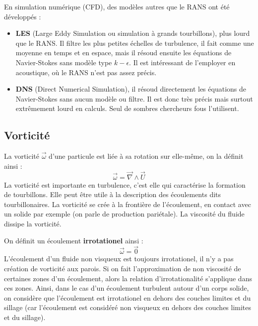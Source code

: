 En simulation numérique (CFD), des modèles autres que le RANS ont été développés :
%
\begin{itemize}
    \item \textbf{LES} (Large Eddy Simulation ou simulation à grands tourbillons), plus lourd que le RANS. Il filtre les plus petites échelles de turbulence, il fait comme une moyenne en temps et en espace, mais il résoud ensuite les équations de Navier-Stokes sans modèle type $k-\epsilon$. Il est intéressant de l'employer en acoustique, où le RANS n'est pas assez précis.
    \item \textbf{DNS} (Direct Numerical Simulation), il résoud directement les équations de Navier-Stokes sans aucun modèle ou filtre. Il est donc très précis mais surtout extrêmement lourd en calculs. Seul de sombres chercheurs fous l'utilisent.
\end{itemize}

\subsection*{Vorticité}

La vorticité $\vec{\omega}$ d'une particule est liée à sa rotation sur elle-même, on la définit ainsi :
%
\begin{equation}
\vec{\omega} = \vec{\nabla} \wedge \vec{U}
\end{equation}
%
La vorticité est importante en turbulence, c'est elle qui caractérise la formation de tourbillons. Elle peut être utile à la description des écoulements dits tourbillonaires. La vorticité se crée à la frontière de l'écoulement, en contact avec un solide par exemple (on parle de production pariétale). La viscosité du fluide dissipe la vorticité.

On définit un écoulement \textbf{irrotationel} ainsi :
%
\begin{equation}
\vec{\omega} = \vec{0}
\end{equation}
%
L'écoulement d'un fluide non visqueux est toujours irrotationel, il n'y a pas création de vorticité aux parois. Si on fait l'approximation de non viscosité de certaines zones d'un écoulement, alors la relation d'irrotationalité s'applique dans ces zones. Ainsi, dans le cas d'un écoulement turbulent autour d'un corps solide, on considère que l'écoulement est irrotationel en dehors des couches limites et du sillage (car l'écoulement est considéré non visqueux en dehors des couches limites et du sillage).

